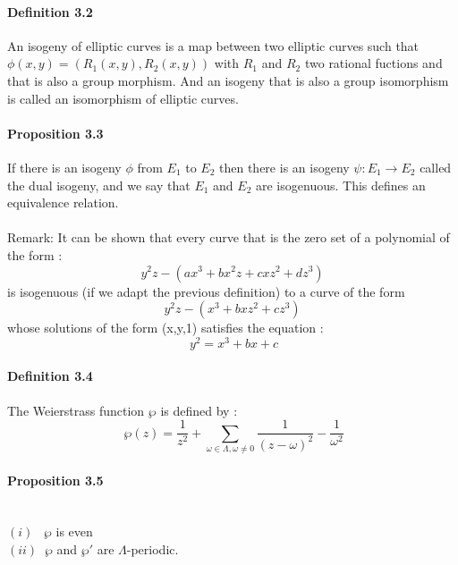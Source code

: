 \documentclass[letterpaper,10pt]{article}
\begin{document}
\paragraph{Definition 3.2} An isogeny of elliptic curves is a map  between two elliptic curves such that $ \phi(x,y) = (R_1(x,y),R_2(x,y))$ 
with $R_1$ and $R_2$ two rational fuctions and that is also a group morphism. And an isogeny that is also a group isomorphism is called an isomorphism of
elliptic curves.

\paragraph{Proposition 3.3} If there is an isogeny $\phi$ from $E_1$ to $E_2$ then there is an isogeny
$\psi : E_1 \to E_2$ called the dual isogeny, and we say that $E_1$ and $E_2$ are isogenuous.
This defines an equivalence relation.

{\itshape \paragraph{}Remark: It can be shown that every curve that is the zero set of a polynomial of the form : 
\[ y^2z - (ax^3+bx^2z+ cxz^2 + dz^3)\]
is isogenuous (if we adapt the previous definition) to a curve of the form \[ y^2z - (x^3+bxz^2 + cz^3)\]
whose solutions of the form (x,y,1) satisfies the equation : \[\ y^2 = x^3 + bx + c \]

}



\paragraph{Definition 3.4} The Weierstrass function $\wp$ is defined by : 
\[\ \wp(z) = \frac{1}{z^2} +  \sum_{\omega \in \Lambda , \omega \neq 0 }\frac{1}{(z - \omega)^2} - \frac{1}{\omega^2} \]
\paragraph{Proposition 3.5} \textbf{ }\\ $(i)\;\;\; \wp$ is even \\  $(ii)\;\;\wp$ and $\wp'$ are $\Lambda$-periodic.
\end{document}
